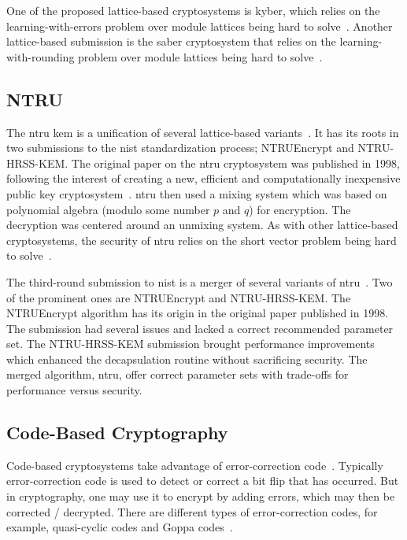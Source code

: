 One of the proposed lattice-based cryptosystems is \gls{kyber}, which relies on the learning-with-errors problem over module lattices being hard to solve~\cite{kyber2021}. Another lattice-based submission is the \gls{saber} cryptosystem that relies on the learning-with-rounding problem over module lattices being hard to solve~\cite{saber}.

\subsection{NTRU}

The \gls{ntru} \gls{kem} is a unification of several lattice-based variants~\cite{ntru2020}. It has its roots in two submissions to the \gls{nist} standardization process; NTRUEncrypt and NTRU-HRSS-KEM. The original paper on the \gls{ntru} cryptosystem was published in 1998, following the interest of creating a new, efficient and computationally inexpensive public key cryptosystem~\cite{ntru1998}. \gls{ntru} then used a mixing system which was based on polynomial algebra (modulo some number $p$ and $q$) for encryption. The decryption was centered around an unmixing system. As with other lattice-based cryptosystems, the security of \gls{ntru} relies on the short vector problem being hard to solve~\cite{sun2020, ntru1998}.

The third-round submission to \gls{nist} is a merger of several variants of \gls{ntru}~\cite{ntru2020}. Two of the prominent ones are NTRUEncrypt and NTRU-HRSS-KEM. The NTRUEncrypt algorithm has its origin in the original paper published in 1998. The submission had several issues and lacked a correct recommended parameter set. The NTRU-HRSS-KEM submission brought performance improvements which enhanced the decapsulation routine without sacrificing security. The merged algorithm, \gls{ntru}, offer correct parameter sets with trade-offs for performance versus security.

\subsection{Code-Based Cryptography}
Code-based cryptosystems take advantage of error-correction code~\cite{bernstein2017}. Typically error-correction code is used to detect or correct a bit flip that has occurred. But in cryptography, one may use it to encrypt by adding errors, which may then be corrected / decrypted. There are different types of error-correction codes, for example, quasi-cyclic codes and Goppa codes~\cite{sendrier2011}.

